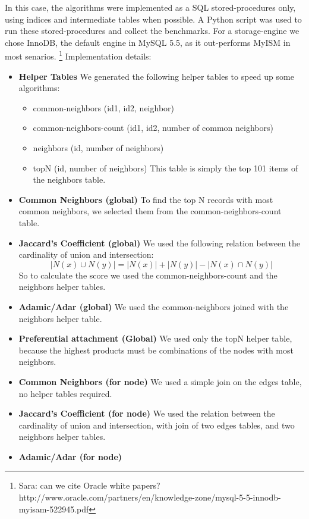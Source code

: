 In this case, the algorithms were implemented as a SQL stored-procedures only,
using indices and intermediate tables when possible. A Python script was used
to run these stored-procedures and collect the benchmarks. For a storage-engine 
we chose InnoDB, the default engine in MySQL 5.5, as it out-performs MyISM in 
most senarios. \footnote{Sara: can we cite Oracle white papers? 
http://www.oracle.com/partners/en/knowledge-zone/mysql-5-5-innodb-myisam-522945.pdf}
\linebreak
Implementation details:
\begin{itemize}
	\item {\bf Helper Tables} 
        We generated the following helper tables to speed up some algorithms:
		\begin{itemize}
			\item {common-neighbors (id1, id2, neighbor)}
			\item {common-neighbors-count (id1, id2, number of common neighbors)}
			\item {neighbors (id, number of neighbors)}
			\item {topN (id, number of neighbors)}
				This table is simply the top 101 items of the neighbors table.
		\end{itemize}
	\item {\bf Common Neighbors (global)} 
		To find the top N records with most common neighbors, 
		we selected them from the common-neighbors-count table.
	\item {\bf Jaccard's Coefficient (global)} 
		We used the following relation between the cardinality of union and intersection:
		\[{|N(x) \cup N(y)|} = {|N(x)| + |N(y)| - |N(x) \cap N(y)|}\]
		So to calculate the score we used the common-neighbors-count and the neighbors helper tables.
	\item {\bf Adamic/Adar (global)} 
		We used the common-neighbors joined with the neighbors helper table.
	\item {\bf Preferential attachment (Global)}
		We used only the topN helper table, because the highest products 
		must be combinations of the nodes with most neighbors.
	\item {\bf Common Neighbors (for node)}
		We used a simple join on the edges table, no helper tables required.
	\item {\bf Jaccard's Coefficient (for node)}
		We used the relation between the cardinality of union and intersection,
		with join of two edges tables, and two neighbors helper tables.
	\item {\bf Adamic/Adar (for node)}

\end{itemize}
